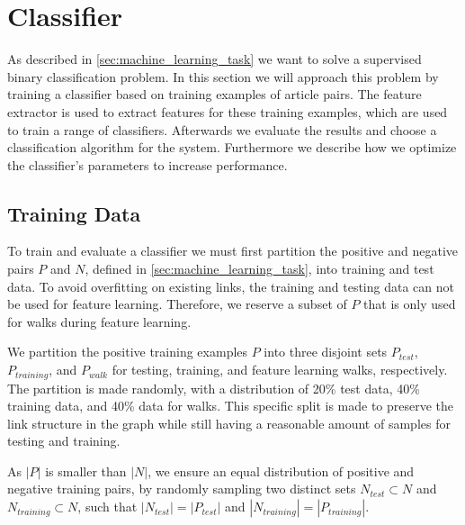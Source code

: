 \section{Classifier}\label{sec:classifier}
As described in \cref{sec:machine_learning_task} we want to solve a supervised binary classification problem. In this section we will approach this problem by training a classifier based on training examples of article pairs. The feature extractor is used to extract features for these training examples, which are used to train a range of classifiers. Afterwards we evaluate the results and choose a classification algorithm for the system. Furthermore we describe how we optimize the classifier's parameters to increase performance.

\subsection{Training Data}\label{sec:training_data}
To train and evaluate a classifier we must first partition the positive and negative pairs $P$ and $N$, defined in \cref{sec:machine_learning_task}, into training and test data. To avoid overfitting on existing links, the training and testing data can not be used for feature learning. Therefore, we reserve a subset of $P$ that is only used for walks during feature learning.

We partition the positive training examples $P$ into three disjoint sets $P_{test}$, $P_{training}$, and $P_{walk}$ for testing, training, and feature learning walks, respectively. The partition is made randomly, with a distribution of 20\% test data, 40\% training data, and 40\% data for walks. This specific split is made to preserve the link structure in the graph while still having a reasonable amount of samples for testing and training.



As $\left\vert{P}\right\vert$ is smaller than $\left\vert{N}\right\vert$, we ensure an equal distribution of positive and negative training pairs, by randomly sampling two distinct sets $N_{test} \subset N$ and $N_{training} \subset N$, such that $\left\vert{N_{test}}\right\vert=\left\vert{P_{test}}\right\vert$ and $\left\vert{N_{training}}\right\vert=\left\vert{P_{training}}\right\vert$.

